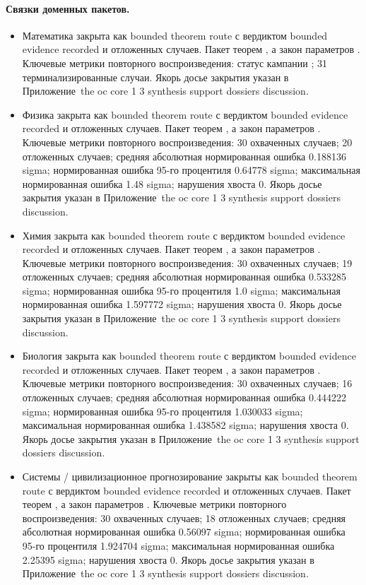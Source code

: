\paragraph{Связки доменных пакетов.}
\begin{itemize}[leftmargin=1.6em,nosep]
\item Математика закрыта как bounded theorem route с вердиктом bounded evidence recorded и  отложенных случаев. Пакет теорем , а закон параметров . Ключевые метрики повторного воспроизведения: статус кампании ; 31 терминализированные случаи. Якорь досье закрытия указан в Приложение~the oc core 1 3 synthesis support dossiers discussion.
\item Физика закрыта как bounded theorem route с вердиктом bounded evidence recorded и  отложенных случаев. Пакет теорем , а закон параметров . Ключевые метрики повторного воспроизведения: 30 охваченных случаев; 20 отложенных случаев; средняя абсолютная нормированная ошибка 0.188136 sigma; нормированная ошибка 95-го процентиля 0.64778 sigma; максимальная нормированная ошибка 1.48 sigma; нарушения хвоста 0. Якорь досье закрытия указан в Приложение~the oc core 1 3 synthesis support dossiers discussion.
\item Химия закрыта как bounded theorem route с вердиктом bounded evidence recorded и  отложенных случаев. Пакет теорем , а закон параметров . Ключевые метрики повторного воспроизведения: 30 охваченных случаев; 19 отложенных случаев; средняя абсолютная нормированная ошибка 0.533285 sigma; нормированная ошибка 95-го процентиля 1.0 sigma; максимальная нормированная ошибка 1.597772 sigma; нарушения хвоста 0. Якорь досье закрытия указан в Приложение~the oc core 1 3 synthesis support dossiers discussion.
\item Биология закрыта как bounded theorem route с вердиктом bounded evidence recorded и  отложенных случаев. Пакет теорем , а закон параметров . Ключевые метрики повторного воспроизведения: 30 охваченных случаев; 16 отложенных случаев; средняя абсолютная нормированная ошибка 0.444222 sigma; нормированная ошибка 95-го процентиля 1.030033 sigma; максимальная нормированная ошибка 1.438582 sigma; нарушения хвоста 0. Якорь досье закрытия указан в Приложение~the oc core 1 3 synthesis support dossiers discussion.
\item Системы / цивилизационное прогнозирование закрыты как bounded theorem route с вердиктом bounded evidence recorded и  отложенных случаев. Пакет теорем , а закон параметров . Ключевые метрики повторного воспроизведения: 30 охваченных случаев; 18 отложенных случаев; средняя абсолютная нормированная ошибка 0.56097 sigma; нормированная ошибка 95-го процентиля 1.924704 sigma; максимальная нормированная ошибка 2.25395 sigma; нарушения хвоста 0. Якорь досье закрытия указан в Приложение~the oc core 1 3 synthesis support dossiers discussion.

\end{itemize}
